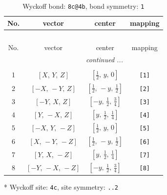 \documentclass[fleqn,8pt]{jsarticle}
\begin{document}
\renewcommand{\arraystretch}{1.2}
\begin{longtable}{cccc}
\caption{Wyckoff bond: {\tt 8c@4b}, bond symmetry: {\tt 1}}
 \\
 \hline \hline
No. & vector & center & mapping \\ \hline \endfirsthead

\multicolumn{3}{l}{\tablename\ \thetable{}} \\
 \hline \hline
No. & vector & center & mapping \\ \hline \endhead

 \hline \hline
\multicolumn{3}{r}{\footnotesize\it continued ...} \\ \endfoot

 \hline \hline
\multicolumn{3}{r}{} \\ \endlastfoot

1 & $\left[ X,\, Y,\, Z \right]$ & $\left[ \frac{1}{2},\, y,\, 0 \right]$ & {\tt [1]} \\ \hline
2 & $\left[ - X,\, - Y,\, Z \right]$ & $\left[ \frac{1}{2},\, - y,\, \frac{1}{2} \right]$ & {\tt [2]} \\ \hline
3 & $\left[ - Y,\, X,\, Z \right]$ & $\left[ - y,\, \frac{1}{2},\, \frac{3}{4} \right]$ & {\tt [3]} \\ \hline
4 & $\left[ Y,\, - X,\, Z \right]$ & $\left[ y,\, \frac{1}{2},\, \frac{1}{4} \right]$ & {\tt [4]} \\ \hline
5 & $\left[ - X,\, Y,\, - Z \right]$ & $\left[ \frac{1}{2},\, y,\, 0 \right]$ & {\tt [5]} \\ \hline
6 & $\left[ X,\, - Y,\, - Z \right]$ & $\left[ \frac{1}{2},\, - y,\, \frac{1}{2} \right]$ & {\tt [6]} \\ \hline
7 & $\left[ Y,\, X,\, - Z \right]$ & $\left[ y,\, \frac{1}{2},\, \frac{1}{4} \right]$ & {\tt [7]} \\ \hline
8 & $\left[ - Y,\, - X,\, - Z \right]$ & $\left[ - y,\, \frac{1}{2},\, \frac{3}{4} \right]$ & {\tt [8]} \\
\end{longtable}
* Wyckoff site: {\tt 4c}, site symmetry: {\tt ..2}
\renewcommand{\arraystretch}{1.2}
\end{document}
